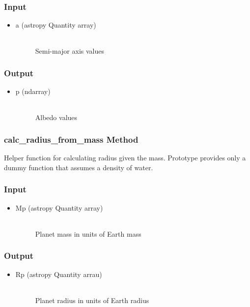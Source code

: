 \documentclass[cleanfoot]{asme2ej}
\begin{document}
\subsubsection*{Input}
\begin{itemize}
\item
\begin{description}
    \item[a (astropy Quantity array)] \hfill \\ Semi-major axis values
\end{description}
\end{itemize}
\subsubsection*{Output}
\begin{itemize}
\item
\begin{description}
    \item[p (ndarray)] \hfill \\ Albedo values
\end{description}
\end{itemize}

\subsubsection{calc\_radius\_from\_mass Method} \label{sec:calcradiusfrommasstask}
Helper function for calculating radius given the mass. Prototype provides only a dummy function that assumes a density of water.
\subsubsection*{Input}
\begin{itemize}
\item
\begin{description}
    \item[Mp (astropy Quantity array)] \hfill \\ Planet mass in units of Earth mass
\end{description}
\end{itemize}
\subsubsection*{Output}
\begin{itemize}
\item
\begin{description}
    \item[Rp (astropy Quantity arrau)] \hfill \\ Planet radius in units of Earth radius
\end{description}
\end{itemize}
\end{document}
